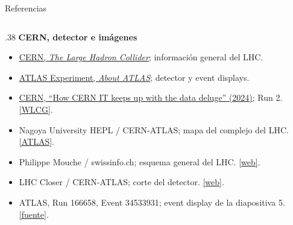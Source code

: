 \documentclass[aspectratio=169,11pt]{beamer}
\begin{document}
\begin{frame}{Referencias}
\begin{columns}[T,totalwidth=.98\textwidth]
\begin{column}{.38\textwidth}
{\color{AtlasBlue}\bfseries\small CERN, detector e imágenes}\par
\vspace{0.06cm}
{\tiny
\begin{itemize}
\setlength{\itemsep}{0.11cm}
\item \href{https://home.cern/science/accelerators/large-hadron-collider/}{CERN, \emph{The Large Hadron Collider}}; información general del LHC.
\item \href{https://atlas.cern/about}{ATLAS Experiment, \emph{About ATLAS}}; detector y event displays.
\item \href{https://home.cern/how-cern-it-keeps-data-deluge/}{CERN, ``How CERN IT keeps up with the data deluge'' (2024)}; Run 2. \href{https://home.cern/science/computing/grid/}{\color{AtlasCyan}[WLCG]}.
\item Nagoya University HEPL / CERN-ATLAS; mapa del complejo del LHC. \href{https://atlas.cern/}{\color{AtlasCyan}[ATLAS]}.
\item Philippe Mouche / swissinfo.ch; esquema general del LHC. \href{https://www.swissinfo.ch/}{\color{AtlasCyan}[web]}.
\item LHC Closer / CERN-ATLAS; corte del detector. \href{https://www.lhc-closer.es/}{\color{AtlasCyan}[web]}.
\item ATLAS, Run 166658, Event 34533931; event display de la diapositiva 5. \href{https://twiki.cern.ch/twiki/bin/view/AtlasPublic/EventDisplayCONFnotes}{\color{AtlasCyan}[fuente]}.
\end{itemize}}

\vspace{0.05cm}
\end{column}
\end{columns}
\end{frame}
\end{document}

